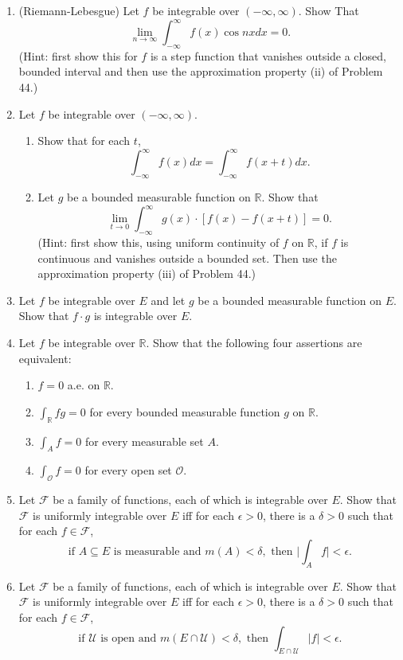 \begin{enumerate}
    \item (Riemann-Lebesgue) Let $f$ be integrable over $(-\infty,\infty)$. Show That
    \[
        \lim_{n\to\infty}\int_{-\infty}^\infty f(x) \cos nxdx=0.    
    \]
    (Hint: first show this for $f$ is a step function that vanishes outside a closed, bounded interval and then use the approximation property (ii) of Problem 44.)
    \item Let $f$ be integrable over $(-\infty,\infty)$.
    \begin{enumerate}[label=(\roman*),align=left]
        \item Show that for each $t$,
        \[
            \int_{-\infty}^\infty f(x)dx=\int_{-\infty}^\infty f(x+t)dx.  
        \]
        \item Let $g$ be a bounded measurable function on $\mathbb{R}$. Show that 
        \[
            \lim_{t\to0}\int_{-\infty}^\infty g(x)\cdot[f(x)-f(x+t)]=0.
        \] 
        (Hint: first show this, using uniform continuity of $f$ on $\mathbb{R}$, if $f$ is continuous and vanishes outside a bounded set. Then use the approximation property (iii) of Problem 44.)
    \end{enumerate}
    \item Let $f$ be integrable over $E$ and let $g$ be a bounded measurable function on $E$. Show that $f\cdot g$ is integrable over $E$.
    \item Let $f$ be integrable over $\mathbb{R}$. Show that the following four assertions are equivalent:
    \begin{enumerate}[label=(\roman*),align=left]
        \item $f=0$ a.e. on $\mathbb{R}$.
        \item $\int_{\mathbb{R}}fg=0$ for every bounded measurable function $g$ on $\mathbb{R}$.
        \item $\int_Af=0$ for every measurable set $A$.
        \item $\int_{\mathcal{O}}f=0$ for every open set $\mathcal{O}$.
    \end{enumerate}
    \item Let $\mathcal{F}$ be a family of functions, each of which is integrable over $E$. Show that $\mathcal{F}$ is uniformly integrable over $E$ iff for each $\epsilon>0$, there is a $\delta>0$ such that for each $f\in\mathcal{F}$,
    \[
        \text{if }A\subseteq E\text{ is measurable and }m(A)<\delta,\text{ then }\biggl |\int_Af\biggr |<\epsilon.
    \]
    \item Let $\mathcal{F}$ be a family of functions, each of which is integrable over $E$. Show that $\mathcal{F}$ is uniformly integrable over $E$ iff for each $\epsilon>0$, there is a $\delta>0$ such that for each $f\in\mathcal{F}$,
    \[
        \text{if }\mathcal{U}\text{ is open and }m(E\cap\mathcal{U})<\delta,\text{ then }\int_{E\cap\mathcal{U}}|f|<\epsilon.
    \]
\end{enumerate}